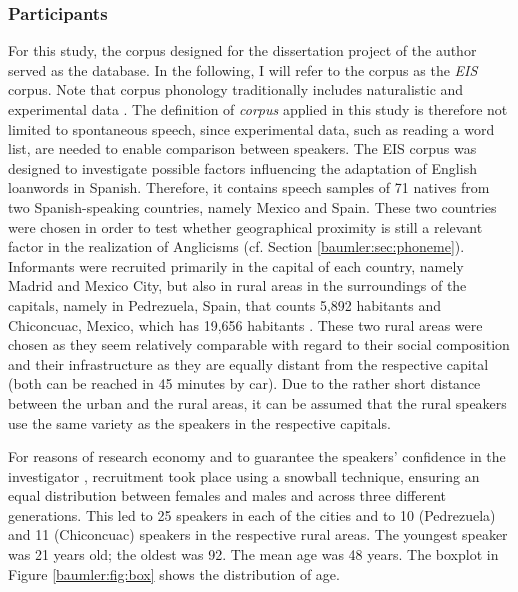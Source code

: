 \documentclass[output=paper]{langscibook}
\begin{document}
\subsubsection{Participants} \label{baumler:sec:participants}
For this study, the corpus designed for the dissertation project of the author \citep[]{Baumler} served as the database. In the following, I will refer to the corpus as the \textit{\gls*{EIS}} corpus. Note that corpus phonology traditionally includes naturalistic and experimental data \citetext{\citealp[324]{Eychenne2021}, \citealp[736]{Chaudron2007}}. The definition of \textit{corpus} applied  in this study is therefore not limited to spontaneous speech, since experimental data, such as reading a word list, are needed to enable comparison between speakers.  The \gls*{EIS} corpus was designed to investigate possible factors influencing the adaptation of English loanwords in Spanish. Therefore, it contains speech samples of 71 natives from two Spanish-speaking countries, namely Mexico and Spain. These two countries were chosen in order to test whether geographical proximity is still a relevant factor in the realization of Anglicisms (cf. Section \ref{baumler:sec:phoneme}).
Informants were recruited primarily in the capital of each country, namely Madrid and Mexico City, but also in rural areas in the surroundings of the capitals, namely in Pedrezuela, Spain, that counts 5,892 habitants \citep[]{INE2019} and Chiconcuac, Mexico, which has 19,656 habitants \citep[]{INEGI2009}. 
These two rural areas were chosen as they seem relatively comparable with regard to their social composition and their infrastructure as they are equally distant from the respective capital (both can be reached in 45 minutes by car). Due to the rather short distance between the urban and the rural areas, it can be assumed that the rural speakers use the same variety as the speakers in the respective capitals.

For reasons of research economy and to guarantee the speakers' confidence in the investigator \citetext{\citealp[13]{Pustka2018}; \citealp[32]{Milroy2003}}, recruitment took place using a snowball technique, ensuring an equal distribution between females and males and across three different generations. This led to 25 speakers in each of the cities and to 10 (Pedrezuela) and 11 (Chiconcuac) speakers in the respective rural areas. The youngest speaker was 21 years old; the oldest was 92. The mean age was 48 years. The boxplot in Figure \ref{baumler:fig:box} shows the distribution of age.
\end{document}
